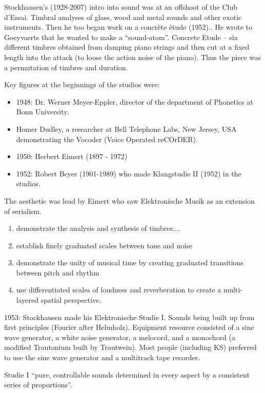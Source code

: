 Stockhausen's (1928-2007) intro into sound was at an offshoot of the Club d'Essai. Timbral analyses of glass, wood and metal sounds and other exotic instruments. Then he too began work on a concr\`ete \'etude (1952).. He wrote to Goeyvaerts that he wanted to
make a ``sound-atom''. Concrete Etude – six different timbres obtained from damping piano strings and then cut at a fixed length into the attack (to loose the action noise of the piano). Thus the piece was a permutation of timbres and duration.

Key figures at the beginnings of the studios were:
\begin{itemize}
\item 1948: Dr. Werner Meyer-Eppler, director of the department of Phonetics at Bonn
University.
\item Homer Dudley, a researcher at Bell Telephone Labs, New Jersey, USA demonstrating the Vocoder (Voice Operated reCOrDER).
\item 1950: Herbert Eimert (1897 - 1972)
\item 1952: Robert Beyer (1901-1989) who made Klangstudie II (1952) in the studios.
\end{itemize}

The aesthetic was lead by Eimert who saw Elektronische Musik as an extension of serialism.
\begin{enumerate}
\item demonstrate the analysis and synthesis of timbres:...
\item establish finely graduated scales between tone and noise
\item demonstrate the unity of musical time by creating graduated transitions between
pitch and rhythm
\item use differentiated scales of loudness and reverberation to create a multi-layered
spatial perspective.
\end{enumerate}

1953: Stockhausen made his Elektronische Studie I. Sounds being built up from first principles (Fourier after Helmholz). Equipment resource consisted of a sine wave generator, a white noise generator, a melocord, and a monochord (a modified Trautonium built by Trautwein). Most people (including KS) preferred to use the sine wave generator and a multitrack tape recorder.

Studie I ``pure, controllable sounds determined in every aspect by a consistent series of proportions''.

